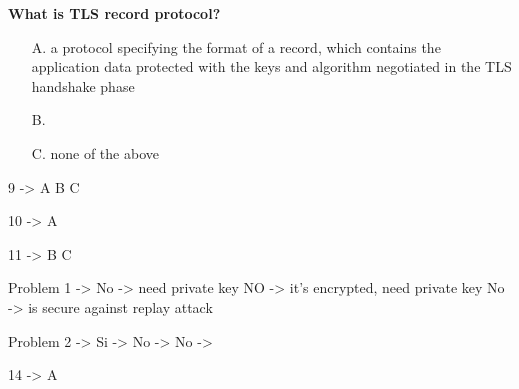 \textbf{What is TLS record protocol?}
\begin{itemize}
    \item[A.] a protocol specifying the format of a record, which contains the application data protected with the keys and algorithm negotiated in the TLS handshake phase
    \item[B.] 
    \item[C.] none of the above
\end{itemize}
\com{}

9 -> A B C 

10 -> A

11 -> B C

Problem 1 ->  {
    No -> need private key
    NO -> it's encrypted, need private key
    No -> is secure against replay attack
}

Problem 2 -> {
    Si -> 
    No -> 
    No -> 
}

14 -> A 
